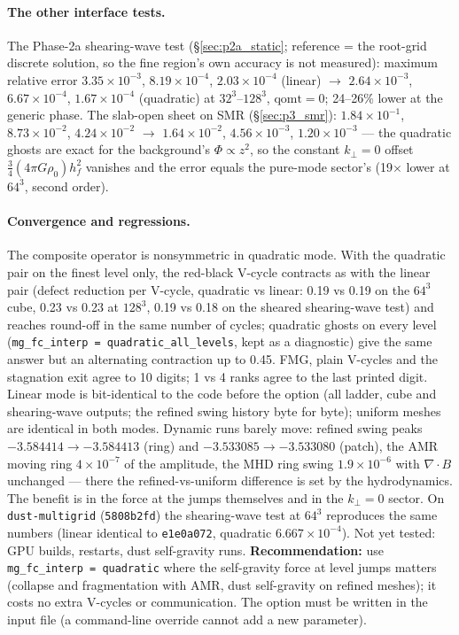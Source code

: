 \documentclass[11pt]{article}
\newcommand{\code}[1]{\texttt{#1}}
\begin{document}
\paragraph{The other interface tests.} The Phase-2a shearing-wave test (\S\ref{sec:p2a_static};
reference = the root-grid discrete solution, so the fine region's own accuracy is not measured):
maximum relative error $3.35\times10^{-3}$, $8.19\times10^{-4}$, $2.03\times10^{-4}$ (linear) $\to$
$2.64\times10^{-3}$, $6.67\times10^{-4}$, $1.67\times10^{-4}$ (quadratic) at $32^3$--$128^3$,
$\mathrm{qomt} = 0$; 24--26\% lower at the generic phase. The slab-open sheet on SMR
(\S\ref{sec:p3_smr}): $1.84\times10^{-1}$, $8.73\times10^{-2}$, $4.24\times10^{-2}$ $\to$
$1.64\times10^{-2}$, $4.56\times10^{-3}$, $1.20\times10^{-3}$ --- the quadratic ghosts are exact for
the background's $\Phi \propto z^2$, so the constant $k_\perp = 0$ offset
$\tfrac34(4\pi G\rho_0)h_f^2$ vanishes and the error equals the pure-mode sector's (19$\times$ lower
at $64^3$, second order).

\paragraph{Convergence and regressions.} The composite operator is nonsymmetric in quadratic
mode. With the quadratic pair on the finest level only, the red-black V-cycle contracts as with the
linear pair (defect reduction per V-cycle, quadratic vs linear: 0.19 vs 0.19 on the $64^3$ cube, 0.23 vs 0.23 at $128^3$,
0.19 vs 0.18 on the sheared shearing-wave test) and reaches round-off in the same number of cycles;
quadratic ghosts on every level (\code{mg\_fc\_interp = quadratic\_all\_levels}, kept as a
diagnostic) give the same answer but an alternating contraction up to 0.45. FMG, plain V-cycles
and the stagnation exit agree to 10 digits; 1 vs 4 ranks agree to the last printed digit.
Linear mode is bit-identical to the code before the option (all ladder, cube and shearing-wave
outputs; the refined swing history byte for byte); uniform meshes are identical in both modes.
Dynamic runs barely move: refined swing peaks $-3.584414 \to -3.584413$ (ring) and
$-3.533085 \to -3.533080$ (patch), the AMR moving ring $4\times10^{-7}$ of the amplitude, the MHD ring
swing $1.9\times10^{-6}$ with $\nabla\!\cdot\!B$ unchanged --- there the refined-vs-uniform
difference is set by the hydrodynamics. The benefit is in the force at the jumps themselves and
in the $k_\perp = 0$ sector. On \code{dust-multigrid} (\code{5808b2fd}) the shearing-wave test at
$64^3$ reproduces the same numbers (linear identical to \code{e1e0a072}, quadratic
$6.667\times10^{-4}$). Not yet tested: GPU builds, restarts, dust self-gravity runs.
\textbf{Recommendation:} use \code{mg\_fc\_interp = quadratic} where the self-gravity force at
level jumps matters (collapse and fragmentation with AMR, dust self-gravity on refined meshes); it
costs no extra V-cycles or communication. The option must be written in the input file (a
command-line override cannot add a new parameter).
\end{document}
